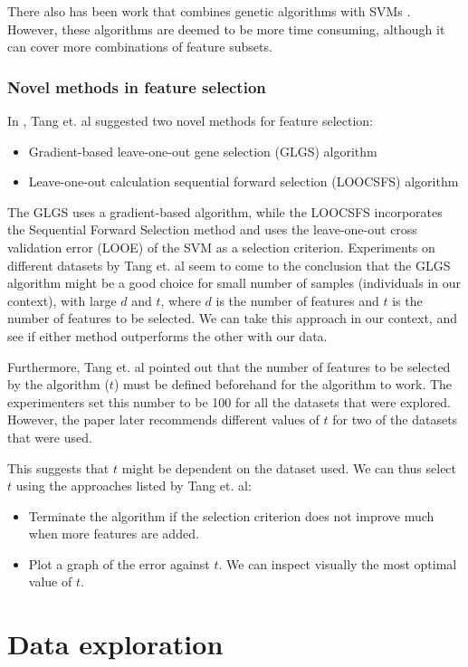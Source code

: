 \documentclass[12pt, twoside, a4paper]{article}
\begin{document}
There also has been work that combines genetic algorithms with SVMs \cite{RefWorks:120}. However, these algorithms are deemed to be more time consuming, although it can cover more combinations of feature subsets.

\subsubsection{Novel methods in feature selection} \label{bg_GLGS}
In \cite{RefWorks:119}, Tang et. al suggested two novel methods for feature selection:
\begin{itemize}
\item Gradient-based leave-one-out gene selection (GLGS) algorithm
\item Leave-one-out calculation sequential forward selection (LOOCSFS) algorithm
\end{itemize}

The GLGS uses a gradient-based algorithm, while the LOOCSFS incorporates the Sequential Forward Selection method and uses the leave-one-out cross validation error (LOOE) of the SVM as a selection criterion. Experiments on different datasets by Tang et. al seem to come to the conclusion that the GLGS algorithm might be a good choice for small number of samples (individuals in our context), with large $d$ and $t$, where $d$ is the number of features and $t$ is the number of features to be selected. We can take this approach in our context, and see if either method outperforms the other with our data.

Furthermore, Tang et. al pointed out that the number of features to be selected by the algorithm ($t$) must be defined beforehand for the algorithm to work. The experimenters set this number to be 100 for all the datasets that were explored. However, the paper later recommends different values of $t$ for two of the datasets that were used.

This suggests that $t$ might be dependent on the dataset used. We can thus select $t$ using the approaches listed by Tang et. al:
\begin{itemize}
\item Terminate the algorithm if the selection criterion does not improve much when more features are added.
\item Plot a graph of the error against $t$. We can inspect visually the most optimal value of $t$.
\end{itemize}

\section{Data exploration}
\end{document}
